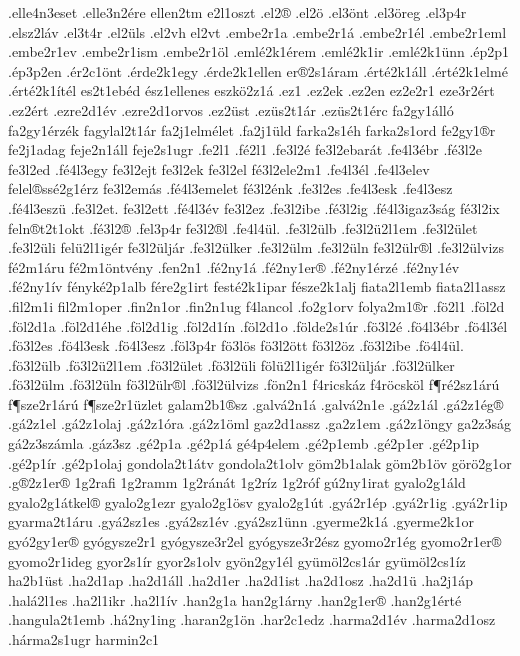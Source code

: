 {.elle4n3eset
.elle3n2ére
ellen2tm
e2l1oszt
.el2®
.el2ö
.el3önt
.el3öreg
.el3p4r
.elsz2láv
.el3t4r
.el2üls       %
.el2vh        %
el2vt
.embe2r1a
.embe2r1á
.embe2r1él
.embe2r1eml
.embe2r1ev
.embe2r1ism
.embe2r1öl
.emlé2k1érem
.emlé2k1ir
.emlé2k1ünn
.ép2p1
.ép3p2en
.ér2c1önt
.érde2k1egy
.érde2k1ellen
er®2s1áram
.érté2k1áll
.érté2k1elmé
.érté2k1ítél
es2t1ebéd
ész1ellenes
eszkö2z1á
.ez1
.ez2ek
.ez2en
ez2e2r1
eze3r2ért
.ez2ért
.ezre2d1év
.ezre2d1orvos
.ez2üst
.ezüs2t1ár
.ezüs2t1érc
fa2gy1álló
fa2gy1érzék
fagylal2t1ár
fa2j1elmélet
.fa2j1üld
farka2s1éh
farka2s1ord
fe2gy1®r
fe2j1adag
feje2n1áll
feje2s1ugr
.fe2l1
.fé2l1
.fe3l2é
fe3l2ebarát
.fe4l3ébr
.fé3l2e
fe3l2ed
.fé4l3egy %
fe3l2ejt
fe3l2ek %
fe3l2el
fé3l2ele2m1
.fe4l3él
.fe4l3elev
felel®ssé2g1érz
fe3l2emás
.fé4l3emelet
fé3l2énk
.fe3l2es
.fe4l3esk
.fe4l3esz
.fé4l3eszü
.fe3l2et.
fe3l2ett
.fé4l3év
fe3l2ez
.fe3l2ibe
.fé3l2ig
.fé4l3igaz3ság
fé3l2ix
feln®t2t1okt
.fé3l2®
.fel3p4r
fe3l2®l
.fe4l4ül.
.fe3l2ülb
.fe3l2ü2l1em
.fe3l2ület
.fe3l2üli
felü2l1igér
fe3l2üljár
.fe3l2ülker
.fe3l2ülm
.fe3l2üln
fe3l2ülr®l
.fe3l2ülvizs
fé2m1áru
fé2m1öntvény
.fen2n1
.fé2ny1á
.fé2ny1er®
.fé2ny1érzé
.fé2ny1év
.fé2ny1ív
fényké2p1alb
fére2g1irt
festé2k1ipar
fésze2k1alj
fiata2l1emb
fiata2l1assz
.fil2m1i
fil2m1oper
.fin2n1or
.fin2n1ug
f4lancol
.fo2g1orv
folya2m1®r
.fö2l1
.föl2d
.föl2d1a
.föl2d1éhe
.föl2d1ig
.föl2d1ín
.föl2d1o
.földe2s1úr
.fö3l2é
.fö4l3ébr
.fö4l3él
.fö3l2es
.fö4l3esk
.fö4l3esz
.föl3p4r
fö3lös
fö3l2ött
fö3l2öz
.fö3l2ibe
.fö4l4ül.
.fö3l2ülb
.fö3l2ü2l1em
.fö3l2ület
.fö3l2üli
fölü2l1igér
fö3l2üljár
.fö3l2ülker
.fö3l2ülm
.fö3l2üln
fö3l2ülr®l
.fö3l2ülvizs
.fön2n1
f4ricskáz
f4röcsköl
f¶ré2sz1árú
f¶sze2r1árú
f¶sze2r1üzlet
galam2b1®sz
.galvá2n1á
.galvá2n1e
.gá2z1ál
.gá2z1ég®
.gá2z1el
.gá2z1olaj
.gá2z1óra
.gá2z1öml
gaz2d1assz
.ga2z1em
.gá2z1öngy
ga2z3ság
gá2z3számla
.gáz3sz
.gé2p1a
.gé2p1á
gé4p4elem
.gé2p1emb
.gé2p1er
.gé2p1ip
.gé2p1ír
.gé2p1olaj
gondola2t1átv
gondola2t1olv
göm2b1alak
göm2b1öv
görö2g1or
.g®2z1er®
1g2rafi
1g2ramm
1g2ránát
1g2ríz
1g2róf
gú2ny1irat
gyalo2g1áld
gyalo2g1átkel®
gyalo2g1ezr
gyalo2g1ösv
gyalo2g1út
.gyá2r1ép
.gyá2r1ig
.gyá2r1ip
gyarma2t1áru
.gyá2sz1es
.gyá2sz1év
.gyá2sz1ünn
.gyerme2k1á
.gyerme2k1or
gyó2gy1er®
gyógysze2r1
gyógysze3r2el
gyógysze3r2ész
gyomo2r1ég
gyomo2r1er®
gyomo2r1ideg
gyor2s1ír
gyor2s1olv
gyön2gy1él
gyümöl2cs1ár
gyümöl2cs1íz
ha2b1üst
.ha2d1ap
.ha2d1áll
.ha2d1er
.ha2d1ist
.ha2d1osz
.ha2d1ü
.ha2j1áp
.halá2l1es
.ha2l1ikr
.ha2l1ív
.han2g1a
han2g1árny
.han2g1er®
.han2g1érté
.hangula2t1emb
.há2ny1ing
.haran2g1ön
.har2c1edz
.harma2d1év
.harma2d1osz
.hárma2s1ugr
harmin2c1
}
